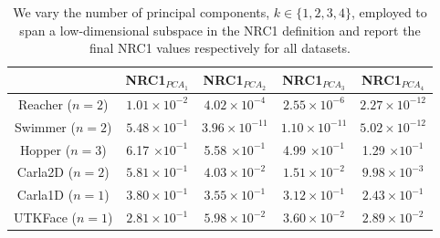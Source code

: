 \begin{table}[h!]
\caption{We vary the number of principal components, $k\in\{1, 2, 3, 4\}$, employed to span a low-dimensional subspace in the NRC1 definition and report the final NRC1 values respectively for all datasets.}
\label{table:nrc1_def}
\vskip 0.15in
\begin{center}
\begin{small}
\begin{tabular}{ccccc}
\toprule
    & NRC1$_{PCA_1}$ & NRC1$_{PCA_2}$ & NRC1$_{PCA_3}$ & NRC1$_{PCA_4}$ \\
\midrule
Reacher ($n=2$) & $1.01\times 10^{-2}$ & $4.02\times 10^{-4}$ & $2.55\times 10^{-6}$ &	$2.27\times 10^{-12}$ \\
\midrule
Swimmer ($n=2$) & $5.48\times 10^{-1}$ & $3.96\times 10^{-11}$ & $1.10\times 10^{-11}$ &	$5.02\times 10^{-12}$ \\
\midrule
Hopper ($n=3$) & 6.17 $\times 10^{-1}$ & 5.58 $\times 10^{-1}$& 4.99 $\times 10^{-1}$& 1.29 $\times 10^{-1}$\\
\midrule
Carla2D ($n=2$) & $5.81\times 10^{-1}$ & $4.03\times 10^{-2}$ & $1.51\times 10^{-2}$ & $9.98\times 10^{-3}$ \\
\midrule
Carla1D ($n=1$) & $3.80\times 10^{-1}$ & $3.55\times 10^{-1}$ & $3.12\times 10^{-1}$ &  $2.43\times 10^{-1}$ \\
\midrule
UTKFace ($n=1$) & $2.81\times 10^{-1}$ & $5.98\times 10^{-2}$ & $3.60\times 10^{-2}$ & $2.89\times 10^{-2}$ \\
\bottomrule
\end{tabular}
\end{small}
\end{center}
\end{table} 